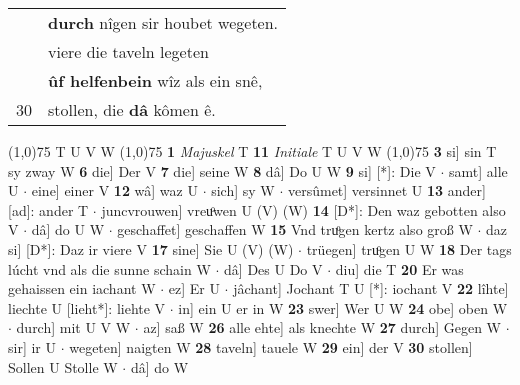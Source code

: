 \documentclass[8pt,a4paper,notitlepage]{article}
\begin{document}
\begin{table}[ht]
\begin{minipage}[t]{0.5\linewidth}
\begin{tabular}{rl}
 & \textbf{durch} nîgen sir houbet wegeten.\\ 
 & viere die taveln legeten\\ 
 & \textbf{ûf helfenbein} wîz als ein snê,\\ 
30 & stollen, die \textbf{dâ} kômen ê.\\ 
\end{tabular}
\scriptsize
\line(1,0){75} \newline
T U V W \newline
\line(1,0){75} \newline
\textbf{1} \textit{Majuskel} T  \textbf{11} \textit{Initiale} T U V W  \newline
\line(1,0){75} \newline
\textbf{3} si] sin T sy zway W \textbf{6} die] Der V \textbf{7} die] seine W \textbf{8} dâ] Do U W \textbf{9} si] [*]: Die V  $\cdot$ samt] alle U  $\cdot$ eine] einer V \textbf{12} wâ] waz U  $\cdot$ sich] sy W  $\cdot$ versûmet] versinnet U \textbf{13} ander] [ad]: ander T  $\cdot$ juncvrouwen] vreuͦwen U (V) (W) \textbf{14} [D*]: Den waz gebotten also V  $\cdot$ dâ] do U W  $\cdot$ geschaffet] geschaffen W \textbf{15} Vnd truͦgen kertz also groß W  $\cdot$ daz si] [D*]: Daz ir viere V \textbf{17} sine] Sie U (V) (W)  $\cdot$ trüegen] truͦgen U W \textbf{18} Der tags lúcht vnd als die sunne schain W  $\cdot$ dâ] Des U Do V  $\cdot$ diu] die T \textbf{20} Er was gehaissen ein iachant W  $\cdot$ ez] Er U  $\cdot$ jâchant] Jochant T U [*]: iochant V \textbf{22} lîhte] liechte U [lieht*]: liehte V  $\cdot$ in] ein U er in W \textbf{23} swer] Wer U W \textbf{24} obe] oben W  $\cdot$ durch] mit U V W  $\cdot$ az] saß W \textbf{26} alle ehte] als knechte W \textbf{27} durch] Gegen W  $\cdot$ sir] ir U  $\cdot$ wegeten] naigten W \textbf{28} taveln] tauele W \textbf{29} ein] der V \textbf{30} stollen] Sollen U Stolle W  $\cdot$ dâ] do W \newline
\end{minipage}
\end{table}
\end{document}
